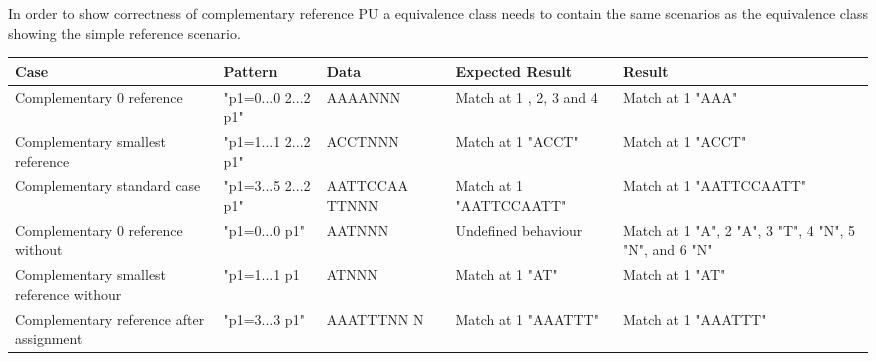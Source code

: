\documentclass[12pt]{article}
\newcommand{\textapprox}{\raisebox{0.5ex}{\texttildelow}}
\newcommand{\pu}{PU }
\begin{document}
In order to show correctness of complementary reference \pu a equivalence class needs to contain the same scenarios
as the equivalence class showing the simple reference scenario.
\begin{table}[H]
\begin{tabular}{p{4cm}|p{3cm}|p{2.5cm}|p{2.5cm}|p{2.5cm}}
Case 			& Pattern & Data & Expected Result & Result \\ \hline
\rowcolor{lightred}
Complementary 0 reference & "p1=0...0 2...2 \textapprox p1" & AAAANNN & Match at 1 , 2, 3 and 4 & Match at 1 "AAA"\\ \hline
\rowcolor{lightgreen}
Complementary smallest reference & "p1=1...1 2...2 \textapprox p1" & ACCTNNN & Match at 1 "ACCT" & Match at 1 "ACCT"\\ \hline
\rowcolor{lightgreen}
Complementary standard case & "p1=3...5 2...2 \textapprox p1" & AATTCCAA TTNNN & Match at 1 "AATTCCAATT" & Match at 1 "AATTCCAATT"\\ \hline
\rowcolor{lightred}
Complementary 0 reference without & "p1=0...0 \textapprox p1" & AATNNN & Undefined behaviour & Match at 1 "A", 2 "A", 3 "T", 4 "N", 5 "N", and 6 "N" \\ \hline
\rowcolor{lightgreen}
Complementary smallest reference withour & "p1=1...1 \textapprox p1 & ATNNN & Match at 1 "AT" & Match at 1 "AT" \\ \hline 
\rowcolor{lightgreen}
Complementary reference after assignment & "p1=3...3 \textapprox p1" & AAATTTNN N & Match at 1 "AAATTT" & Match at 1 "AAATTT"\\ \hline
\end{tabular}
\end{table}
\end{document}
